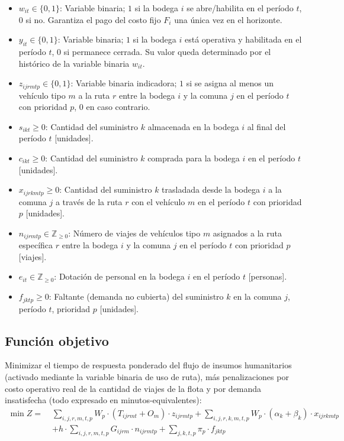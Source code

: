 \documentclass[letterpaper]{article}
\begin{document}
\begin{flushleft}
\begin{itemize}[leftmargin=2em, itemsep=1pt]
  \item $w_{it} \in \{0,1\}$: Variable binaria; $1$ si la bodega $i$ se abre/habilita en el período $t$, $0$ si no. Garantiza el pago del costo fijo $F_i$ una única vez en el horizonte.
  \item $y_{it} \in \{0,1\}$: Variable binaria; $1$ si la bodega $i$ está operativa y habilitada en el período $t$, $0$ si permanece cerrada. Su valor queda determinado por el histórico de la variable binaria $w_{it}$.
  \item $z_{ijrmtp} \in \{0,1\}$: Variable binaria indicadora; $1$ si se asigna al menos un vehículo tipo $m$ a la ruta $r$ entre la bodega $i$ y la comuna $j$ en el período $t$ con prioridad $p$, $0$ en caso contrario.
  \item $s_{ikt} \geq 0$: Cantidad del suministro $k$ almacenada en la bodega $i$ al final del período $t$ [unidades].
  \item $c_{ikt} \geq 0$: Cantidad del suministro $k$ comprada para la bodega $i$ en el período $t$ [unidades].
  \item $x_{ijrkmtp} \geq 0$: Cantidad del suministro $k$ trasladada desde la bodega $i$ a la comuna $j$ a través de la ruta $r$ con el vehículo $m$ en el período $t$ con prioridad $p$ [unidades].
  \item $n_{ijrmtp} \in \mathbb{Z}_{\geq 0}$: Número de viajes de vehículos tipo $m$ asignados a la ruta específica $r$ entre la bodega $i$ y la comuna $j$ en el período $t$ con prioridad $p$ [viajes].
  \item $e_{it} \in \mathbb{Z}_{\geq 0}$: Dotación de personal en la bodega $i$ en el período $t$ [personas].
  \item $f_{jktp} \geq 0$: Faltante (demanda no cubierta) del suministro $k$ en la comuna $j$, período $t$, prioridad $p$ [unidades].
\end{itemize}

\subsection{Función objetivo}

Minimizar el tiempo de respuesta ponderado del flujo de insumos humanitarios (activado mediante la variable binaria de uso de ruta), más penalizaciones por costo operativo real de la cantidad de viajes de la flota y por demanda insatisfecha (todo expresado en minutos-equivalentes):
\begin{equation}
\begin{aligned}
\min Z = \;& \sum_{i,j,r,m,t,p} W_p \cdot (T_{ijrmt} + O_m) \cdot z_{ijrmtp}
           + \sum_{i,j,r,k,m,t,p} W_p \cdot (\alpha_k + \beta_k) \cdot x_{ijrkmtp} \\
          & + h \cdot \sum_{i,j,r,m,t,p} G_{ijrm} \cdot n_{ijrmtp}
           + \sum_{j,k,t,p} \pi_p \cdot f_{jktp}
\end{aligned}
\end{equation}


\end{flushleft}
\end{document}
